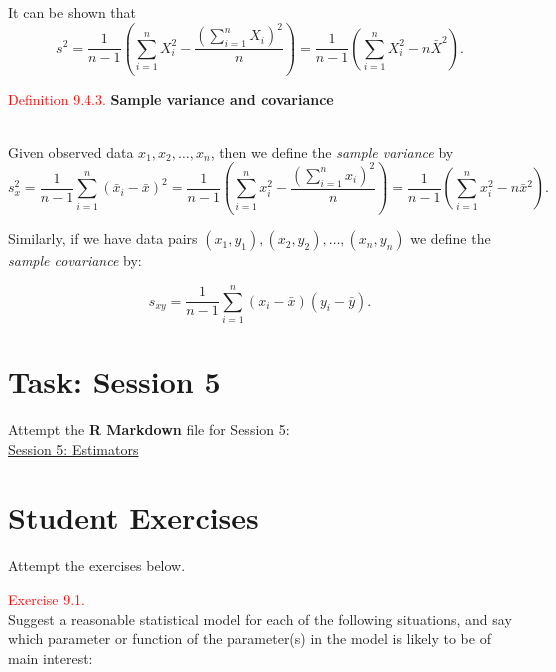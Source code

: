 \documentclass[
]{book}
\begin{document}
It can be shown that
\[ s^2 = \frac{1}{n-1} \left( \sum_{i=1}^n X_i^2 - \frac{\left( \sum_{i=1}^n X_i \right)^2}{n} \right) = \frac{1}{n-1}  \left( \sum_{i=1}^n X_i^2 - n \bar{X}^2 \right). \]

\hypertarget{paraestimate:def:var_cov}{}
\textcolor{red}{Definition 9.4.3.}
{\textbf{Sample variance and covariance}}\\
\strut \\
Given observed data \(x_1, x_2, \ldots, x_n\), then we define the \emph{sample variance} by\\

\[ s_{x}^2 = \frac{1}{n-1} \sum\limits_{i=1}^n (\bar{x}_i - \bar{x})^2 = \frac{1}{n-1} \left( \sum\limits_{i=1}^n x_i^2 - \frac{\left( \sum\limits_{i=1}^n x_i \right)^2}{n} \right) = \frac{1}{n-1} \left(\sum\limits_{i=1}^n x_i^2 - n \bar{x}^2 \right).\]

Similarly, if we have data pairs \((x_1, y_1), (x_2, y_2), \ldots, (x_n,y_n)\) we define the \emph{sample covariance} by:

\[ s_{xy} = \frac{1}{n-1} \sum\limits_{i=1}^n (x_i - \bar{x})(y_i -\bar{y}). \]

\hypertarget{paraestimate:lab}{%
\section*{\texorpdfstring{{\textbf{Task: Session 5}}}{Task: Session 5}}\label{paraestimate:lab}}

Attempt the \textbf{R Markdown} file for Session 5:\\
\href{https://moodle.nottingham.ac.uk/course/view.php?id=134982\#section-2}{Session 5: Estimators}

\hfill\break

\hypertarget{paraestimate:exer}{%
\section*{\texorpdfstring{{\textbf{Student Exercises}}}{Student Exercises}}\label{paraestimate:exer}}

Attempt the exercises below.

\leavevmode{}%
\textcolor{red}{Exercise 9.1.}\\
Suggest a reasonable statistical model for each of the following situations, and say which parameter or function of the parameter(s) in the model is likely to be of main interest:
\end{document}

